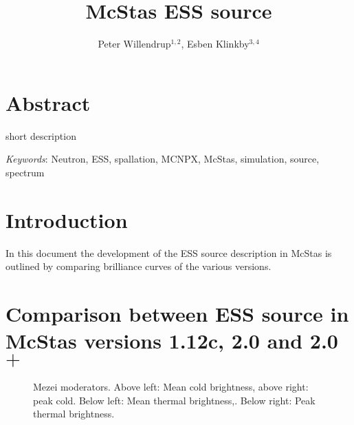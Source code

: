 \documentclass{elsarticle}
\begin{document}
\setpagewiselinenumbers
\begin{frontmatter}
\title{McStas ESS source}
\author{Peter Willendrup$^{1,2}$, Esben Klinkby$^{3,4}$}
\address{1) DTU Physics, Technical University of Denmark, DTU Lyngby Campus, Anker Engelunds Vej 1, DK-2800 Kgs. Lyngby, Denmark}
\address{2) ESS design update programme - Denmark}
\address{3) European Spallation Source ESS AB, Box 176, S-221 00 Lund, Sweden}
\address{4) DTU Nutech, Technical University of Denmark, DTU Ris\o~Campus,\\ Frederiksborgvej 399, DK-4000 Roskilde, Denmark}
\end{frontmatter}
\section{Abstract}
short description




\emph{Keywords}: Neutron, ESS, spallation, MCNPX, McStas, simulation, source, spectrum

\section{Introduction}
In this document the development of the ESS source description in McStas\cite{lefm:1999,will:2013,man,comp} is outlined by comparing brilliance curves of the various versions.

\section{Comparison between ESS source in McStas versions 1.12c, 2.0 and 2.0$+$}
\label{sec:val}

\begin{figure}[h!]
\begin{minipage}{\linewidth}
\centering
{}
\caption{Mezei moderators. Above left: Mean cold brightness, above right: peak cold. Below left: Mean thermal brightness,. Below right: Peak thermal brightness.}
\label{fig:2001}
\end{minipage}\hfill
\end{figure}
\end{document}
